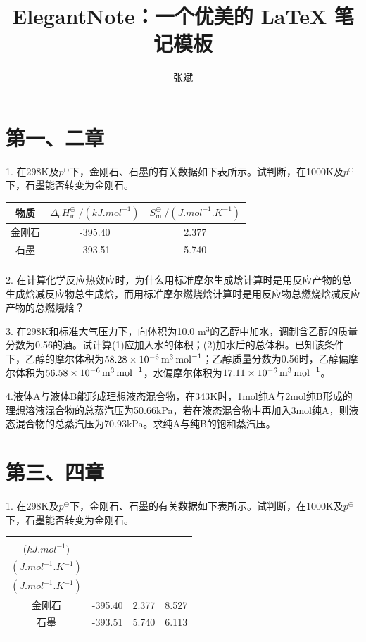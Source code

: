 \documentclass[cn,blue,14pt,normal]{elegantnote}
\title{ElegantNote：一个优美的 \LaTeX{} 笔记模板}
\author{张斌}
\institute{Elegant\LaTeX{} Program}
\date{\zhtoday}
\begin{document}
\section*{第一、二章}
1. 在298K及$p^\ominus$下，金刚石、石墨的有关数据如下表所示。试判断，在1000K及$p^\ominus$下，石墨能否转变为金刚石。
\begin{table}[h]
    \centering
    \begin{tabular}{ccc}
        \Xhline{1pt}
        物质 & $\Delta_\mathrm{c}H_\mathrm{m}^\ominus ~/(\si{kJ.mol^{-1}})$ & $S_\mathrm{m}^\ominus ~/(\si{J.mol^{-1}.K^{-1}})$ \\
        \hline
        金刚石 & -395.40 & 2.377 \\
        石墨 & -393.51 & 5.740 \\
        \Xhline{1pt} 
    \end{tabular}
\end{table}

2. 在计算化学反应热效应时，为什么用标准摩尔生成焓计算时是用反应产物的总生成焓减反应物总生成焓，而用标准摩尔燃烧焓计算时是用反应物总燃烧焓减反应产物的总燃烧焓？
\bigskip

3. 在298K和标准大气压力下，向体积为10.0 m$^3$的乙醇中加水，调制含乙醇的质量分数为0.56的酒。试计算(1)应加入水的体积；(2)加水后的总体积。已知该条件下，乙醇的摩尔体积为$\SI{58.28e{-6}}{m^3.mol^{-1}}$；乙醇质量分数为0.56时，乙醇偏摩尔体积为$\SI{56.58e{-6}}{m^3.mol^{-1}}$，水偏摩尔体积为$\SI{17.11e{-6}}{m^3.mol^{-1}}$。
\bigskip

4.液体A与液体B能形成理想液态混合物，在343K时，1mol纯A与2mol纯B形成的理想溶液混合物的总蒸汽压为50.66kPa，若在液态混合物中再加入3mol纯A，则液态混合物的总蒸汽压为70.93kPa。求纯A与纯B的饱和蒸汽压。

\section*{第三、四章}

1. 在298K及$p^\ominus$下，金刚石、石墨的有关数据如下表所示。试判断，在1000K及$p^\ominus$下，石墨能否转变为金刚石。
\begin{table}[ht]
    \centering
    \begin{tabular}{cccc}
        \Xhline{1pt}
         &\makecell{$\Delta_\mathrm{c}H_\mathrm{m}^\ominus$ \\ ($\si{kJ.mol^{-1}})$}   & \makecell{$S_\mathrm{m}^\ominus$  \\$(\si{J.mol^{-1}.K^{-1}})$} & \makecell{$C_{p,\mathrm{m}}$ \\ $(\si{J.mol^{-1}.K^{-1}})$}\\
        \hline
        金刚石 & -395.40 & 2.377 & 8.527\\
        石墨 & -393.51 & 5.740 & 6.113\\
        \Xhline{1pt} 
    \end{tabular}
\end{table}
\end{document}
